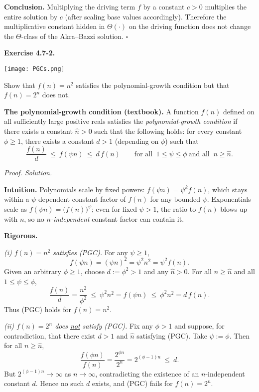 \documentclass[12pt]{article}
\theoremstyle{definition}
\begin{document}
\medskip
\noindent\textbf{Conclusion.}
Multiplying the driving term $f$ by a constant $c>0$ multiplies the entire solution by $c$
(after scaling base values accordingly). Therefore the multiplicative constant hidden in
$\Theta(\cdot)$ on the driving function does not change the $\Theta$-class of the
Akra--Bazzi solution.
\hfill$\square$

\newpage


\noindent\textbf{Exercise 4.7-2.}

\dotfill
\begin{center}
    \texttt{[image: PGCs.png]}
\end{center}
\dotfill

Show that $f(n)=n^{2}$ satisfies the polynomial-growth condition but that $f(n)=2^{n}$ does not.

\medskip
\noindent\textbf{The polynomial-growth condition (textbook).}
A function $f(n)$ defined on all sufficiently large positive reals satisfies the
\emph{polynomial-growth condition} if there exists a constant $\hat n>0$ such that the following holds:
for every constant $\phi\ge 1$, there exists a constant $d>1$ (depending on $\phi$) such that
\[
\frac{f(n)}{d}\ \le\ f(\psi n)\ \le\ d\,f(n)
\qquad\text{for all }~1\le \psi\le \phi~\text{and all }~n\ge \hat n.
\tag{PGC}
\]

\medskip
\noindent\textit{Proof. Solution.}

\noindent\textbf{Intuition.}
Polynomials scale by fixed powers: $f(\psi n)=\psi^{k}f(n)$, which stays within a
$\psi$-dependent constant factor of $f(n)$ for any bounded $\psi$.
Exponentials scale as $f(\psi n)=\big(f(n)\big)^{\psi}$; even for fixed $\psi>1$, the ratio to $f(n)$
blows up with $n$, so no \emph{$n$-independent} constant factor can contain it.

\medskip
\noindent\textbf{Rigorous.}

\emph{(i) $f(n)=n^{2}$ satisfies (PGC).}
For any $\psi\ge 1$,
\[
f(\psi n)= (\psi n)^2=\psi^2 n^2=\psi^{2} f(n).
\]
Given an arbitrary $\phi\ge 1$, choose $d:=\phi^{2}>1$ and any $\hat n>0$.
For all $n\ge \hat n$ and all $1\le \psi\le \phi$,
\[
\frac{f(n)}{d}=\frac{n^{2}}{\phi^{2}}\ \le\ \psi^{2} n^{2}=f(\psi n)\ \le\ \phi^{2} n^{2}=d\,f(n).
\]
Thus (PGC) holds for $f(n)=n^{2}$.

\smallskip
\emph{(ii) $f(n)=2^{n}$ does \underline{not} satisfy (PGC).}
Fix any $\phi>1$ and suppose, for contradiction, that there exist $d>1$ and $\hat n$ satisfying (PGC).
Take $\psi:=\phi$.
Then for all $n\ge \hat n$,
\[
\frac{f(\phi n)}{f(n)}=\frac{2^{\phi n}}{2^{n}}=2^{(\phi-1)n}\ \le\ d.
\]
But $2^{(\phi-1)n}\to\infty$ as $n\to\infty$, contradicting the existence of an $n$-independent constant $d$.
Hence no such $d$ exists, and (PGC) fails for $f(n)=2^{n}$.
\end{document}
